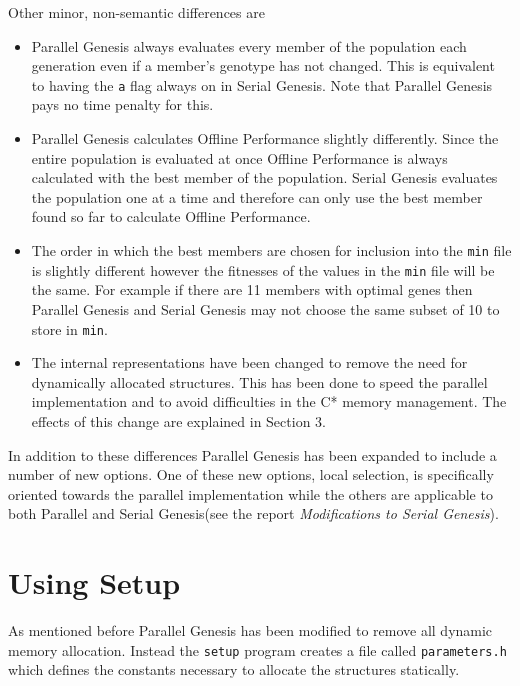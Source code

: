 Other minor, non-semantic differences are
\begin{itemize}
\item Parallel Genesis always evaluates every member of the population each
generation even if a member's genotype has not changed.  This is equivalent
to having the {\tt a} flag always on in Serial Genesis.  Note that Parallel
Genesis pays no time penalty for this.

\item Parallel Genesis calculates Offline Performance slightly differently.
Since the entire population is evaluated at once Offline Performance is
always calculated with the best member of the population.  Serial Genesis
evaluates the population one at a time and therefore can only use the best
member found so far to calculate Offline Performance.

\item The order in which the best members are chosen for inclusion into the
{\tt min} file is slightly different however the fitnesses of the values in
the {\tt min} file will be the same.  For example if there are 11 members with
optimal genes then Parallel Genesis and Serial Genesis may not choose the
same subset of 10 to store in {\tt min}.

\item The internal representations have been changed to remove the need for
dynamically allocated structures.  This has been done to speed the parallel
implementation and to avoid difficulties in the C* memory management.
The effects of this change are explained in Section 3.
\end{itemize}

In addition to these differences Parallel Genesis has been expanded to include
a number of new options.  One of these new options, local selection, is
specifically oriented towards the parallel implementation while the others
are applicable to both Parallel and Serial Genesis(see the report 
{\it Modifications to Serial Genesis}).

\section{Using Setup}

As mentioned before Parallel Genesis has been modified to remove all dynamic
memory allocation.  Instead the {\tt setup} program creates a file called
{\tt parameters.h} which defines the constants necessary to allocate the
structures statically.

